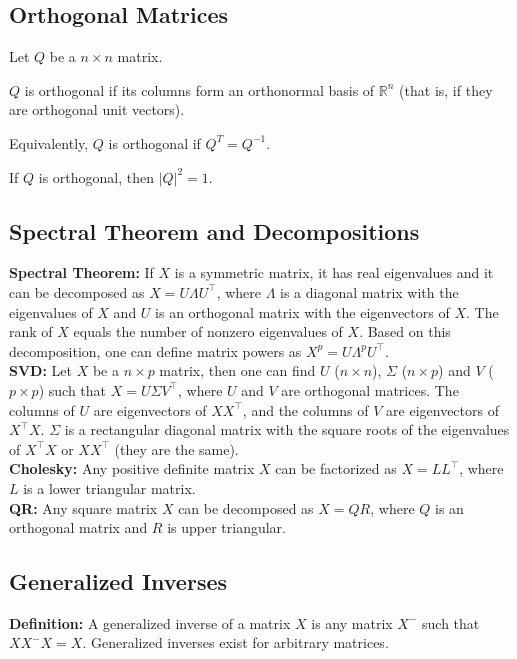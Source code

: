 \documentclass[letterpaper,11pt]{article}
\newenvironment{packed_item}{
\begin{itemize}
  \setlength{\itemsep}{1pt}
  \setlength{\parskip}{0pt}
  \setlength{\parsep}{0pt}
}{\end{itemize}}
\renewcommand{\t}{^\intercal} %
\newcommand{\1}{\mathbf{1}} %
\begin{document}
\subsection{Orthogonal Matrices}
Let $Q$ be a $n \times n$ matrix. 
\begin{packed_item}
\item $Q$ is orthogonal if its columns
form an orthonormal basis of $\mathbb{R}^n$ (that is, if they are
orthogonal unit vectors).
\item Equivalently, $Q$ is orthogonal if $Q^T =
Q^{-1}$. 
\item If $Q$ is orthogonal, then $|Q|^2 = 1$.
\end{packed_item}
\subsection{Spectral Theorem and Decompositions}
\textbf{Spectral Theorem:} If $X$ is a symmetric matrix, it has
real eigenvalues and it can be
decomposed as $X = U \Lambda U^\intercal$, where $\Lambda$ is a
diagonal matrix with the eigenvalues of $X$ and $U$ is an orthogonal
matrix with the eigenvectors of $X$. The rank of $X$ equals the number of nonzero eigenvalues of
$X$. Based on this decomposition, one can define matrix powers as $X^p
= U \Lambda^p U^\intercal$. \\

\textbf{SVD:} Let $X$ be a $n \times p$ matrix, then one can find $U$ ($n
\times n$), $\Sigma$ ($n \times p$) and $V$ ($p \times p$) such that
$X = U \Sigma V \t$, where $U$ and $V$ are orthogonal matrices. The
columns of $U$ are eigenvectors of $X X \t$, and the columns of $V$
are eigenvectors of $X \t X$. $\Sigma$ is a rectangular diagonal matrix
with the square roots of the eigenvalues of $X \t X$ or $X X \t$ (they
are the same). \\

\textbf{Cholesky:} Any positive definite matrix $X$ can be factorized
as $X = L L \t$, where $L$ is a lower triangular matrix. \\

\textbf{QR:} Any square matrix $X$ can be decomposed as $X = QR$,
where $Q$ is an orthogonal matrix and $R$ is upper triangular.

\subsection{Generalized Inverses}

\textbf{Definition:} A generalized inverse of a matrix $X$ is any matrix $X^{-}$ such that $XX^{-}X = X$. Generalized inverses exist for arbitrary matrices. \\
\end{document}
